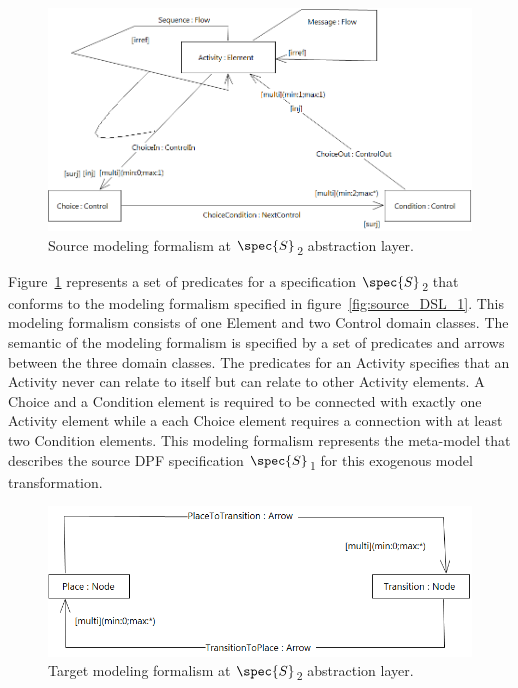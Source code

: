 \begin{figure}[H]
	\centering
	\includegraphics[scale=0.5]{./Figures/DPFactivityMetamodel_2.png}
	\caption[Source modeling formalism]
	{Source modeling formalism at $\spec{S}$\textsubscript{2} abstraction layer.}
	\label{fig:source_DSL_2}
\end{figure}

Figure~\ref{fig:source_DSL_2} represents a set of predicates for a specification
$\spec{S}$\textsubscript{2} that conforms to the modeling formalism specified in
figure~\ref{fig:source_DSL_1}. This modeling formalism consists of one Element
and two Control domain classes. The semantic of the modeling formalism is
specified by a set of predicates and arrows between the three domain classes.
The predicates for an Activity specifies that an Activity never can relate to
itself but can relate to other Activity elements. A Choice and a Condition
element is required to be connected with exactly one Activity element while a
each Choice element requires a connection with at least two Condition elements.
This modeling formalism represents the meta-model that describes the source DPF
specification $\spec{S}$\textsubscript{1} for this exogenous model
transformation.

\begin{figure}[H]
	\centering
	\includegraphics[scale=0.5]{./Figures/DPFpetrinet.png}
	\caption[Target modeling formalism]
	{Target modeling formalism at $\spec{S}$\textsubscript{2} abstraction layer.}
	\label{fig:target_DSL_1}
\end{figure}

